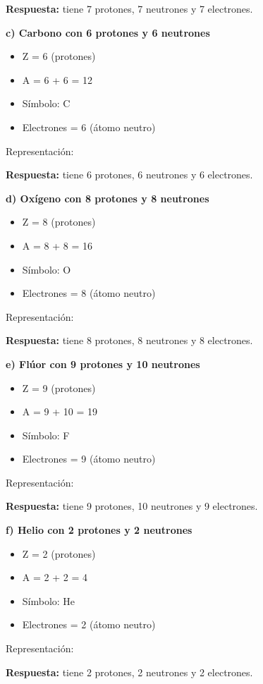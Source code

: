 \begin{exercise}
\begin{solu}
        \textbf{Respuesta:}  tiene 7 protones, 7 neutrones y 7 electrones.

        \textbf{c) Carbono con 6 protones y 6 neutrones}
        \begin{itemize}
            \item Z = 6 (protones)
            \item A = 6 + 6 = 12
            \item Símbolo: C
            \item Electrones = 6 (átomo neutro)
        \end{itemize}
        Representación: 

        \textbf{Respuesta:}  tiene 6 protones, 6 neutrones y 6 electrones.

        \textbf{d) Oxígeno con 8 protones y 8 neutrones}
        \begin{itemize}
            \item Z = 8 (protones)
            \item A = 8 + 8 = 16
            \item Símbolo: O
            \item Electrones = 8 (átomo neutro)
        \end{itemize}
        Representación: 

        \textbf{Respuesta:}  tiene 8 protones, 8 neutrones y 8 electrones.

        \textbf{e) Flúor con 9 protones y 10 neutrones}
        \begin{itemize}
            \item Z = 9 (protones)
            \item A = 9 + 10 = 19
            \item Símbolo: F
            \item Electrones = 9 (átomo neutro)
        \end{itemize}
        Representación: 

        \textbf{Respuesta:}  tiene 9 protones, 10 neutrones y 9 electrones.

        \textbf{f) Helio con 2 protones y 2 neutrones}
        \begin{itemize}
            \item Z = 2 (protones)
            \item A = 2 + 2 = 4
            \item Símbolo: He
            \item Electrones = 2 (átomo neutro)
        \end{itemize}
        Representación: 

        \textbf{Respuesta:}  tiene 2 protones, 2 neutrones y 2 electrones.
    \end{solu}
\end{exercise}

